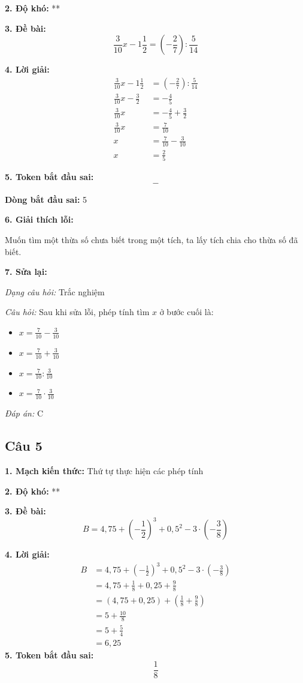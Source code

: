 \noindent\textbf{2. Độ khó:} **

\noindent\textbf{3. Đề bài:}
\[\frac{3}{10}x-1\frac12 =\left(-\frac27\right):\frac5{14}\]

\noindent\textbf{4. Lời giải:}
\begin{align*}
\frac{3}{10}x-1\frac{1}{2}&=\left(-\frac{2}{7}\right):\frac{5}{14}\\
\frac{3}{10}x-\frac{3}{2}&=-\frac{4}{5}\\
\frac{3}{10}x&=-\frac{4}{5}+\frac{3}{2}\\
\frac{3}{10}x&=\frac{7}{10}\\
x&=\frac{7}{10}-\frac{3}{10}\\
x&=\frac{2}{5}
\end{align*}

\noindent\textbf{5. Token bắt đầu sai:}
\[
-
\]

\noindent\textbf{Dòng bắt đầu sai:} 5

\noindent\textbf{6. Giải thích lỗi:}

Muốn tìm một thừa số chưa biết trong một tích, ta lấy tích chia cho thừa số đã biết.

\noindent\textbf{7. Sửa lại:}

\textit{Dạng câu hỏi:} Trắc nghiệm

\textit{Câu hỏi:} Sau khi sửa lỗi, phép tính tìm $x$ ở bước cuối là:

\begin{itemize}
    \item[A.] $\displaystyle x=\frac7{10}-\frac3{10}$
    \item[B.] $\displaystyle x=\frac7{10}+\frac3{10}$
    \item[C.] $\displaystyle x=\frac7{10}:\frac3{10}$
    \item[D.] $\displaystyle x=\frac7{10}\cdot\frac3{10}$
\end{itemize}

\textit{Đáp án:} C

\subsection*{Câu 5}

\noindent\textbf{1. Mạch kiến thức:} Thứ tự thực hiện các phép tính

\noindent\textbf{2. Độ khó:} **

\noindent\textbf{3. Đề bài:}
\[
B=4,75+\left(-\frac12\right)^3+0,5^2-3\cdot\left(-\frac38\right)
\]

\noindent\textbf{4. Lời giải:}
\begin{align*}
B
&=4,75+\left(-\frac12\right)^3+0,5^2-3\cdot\left(-\frac38\right)\\
&=4,75+\frac18+0,25+\frac98\\
&=(4,75+0,25)+\left(\frac18+\frac98\right)\\
&=5+\frac{10}{8}\\
&=5+\frac54\\
&=6,25
\end{align*}
\noindent\textbf{5. Token bắt đầu sai:}
\[
\frac18
\]

